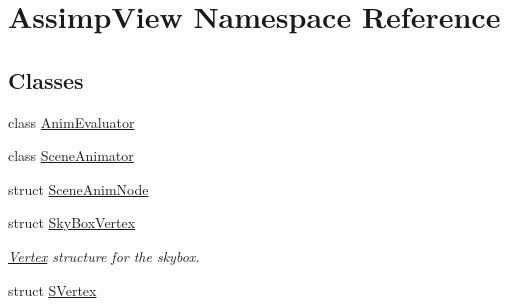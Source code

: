 \hypertarget{namespace_assimp_view}{\section{Assimp\+View Namespace Reference}
\label{namespace_assimp_view}
}
\subsection*{Classes}
\begin{DoxyCompactItemize}
\item 
class \hyperlink{class_assimp_view_1_1_anim_evaluator}{Anim\+Evaluator}
\item 
class \hyperlink{class_assimp_view_1_1_scene_animator}{Scene\+Animator}
\item 
struct \hyperlink{struct_assimp_view_1_1_scene_anim_node}{Scene\+Anim\+Node}
\item 
struct \hyperlink{struct_assimp_view_1_1_sky_box_vertex}{Sky\+Box\+Vertex}
\begin{DoxyCompactList}\small\item\em \hyperlink{struct_vertex}{Vertex} structure for the skybox. \end{DoxyCompactList}\item 
struct \hyperlink{struct_assimp_view_1_1_s_vertex}{S\+Vertex}
\end{DoxyCompactItemize}
